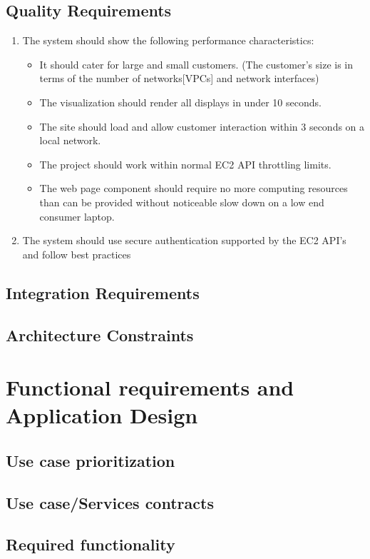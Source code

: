 \documentclass[a4paper,12pt]{report}
\begin{document}
	\subsection{Quality Requirements}
	\begin{enumerate}
		\item The system should show the following performance characteristics:
		\begin{itemize}
			\item It should cater for large and small customers. (The customer's size is in terms of the number of networks[VPCs] and network interfaces)
			\item The visualization should render all displays in under 10 seconds.
			\item The site should load and allow customer interaction within 3 seconds on a local network.
			\item The project should work within normal EC2 API throttling limits.
			\item The web page component should require no more computing resources than can be provided without noticeable slow down on a low end consumer laptop.
		\end{itemize}
		\item The system should use secure authentication supported by the EC2 API's and follow best practices 
	\end{enumerate}
	
	\subsection{Integration Requirements}
	\subsection{Architecture Constraints}
\section{Functional requirements and Application Design}
	\subsection{Use case prioritization}
	\subsection{Use case/Services contracts}
	\subsection{Required functionality}
\end{document}
